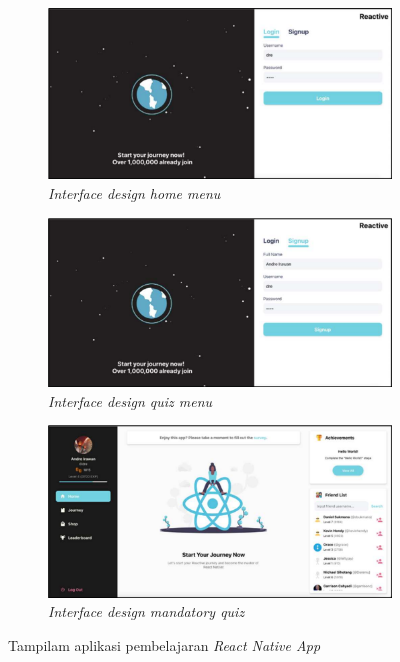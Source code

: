 \begin{figure}[htbp]
	\centering
	\begin{subfigure}[b]{0.4\textwidth}
		\centering
	  \includegraphics[width=\linewidth]{contents/chapter-2/images/Andre-a1.png}
	  \caption{\textit{Interface design home menu}}
	  \label{fig:sub-andre-a1}
	\end{subfigure}
	\begin{subfigure}[b]{0.4\textwidth}
	\centering
	  \includegraphics[width=\linewidth]{contents/chapter-2/images/Andre-a2.png}
	  \caption{\textit{Interface design quiz menu }}
	  \label{fig:sub-andre-a2}
	\end{subfigure}
	\hfill
	\begin{subfigure}[b]{0.4\textwidth}
		\centering
		\includegraphics[width=\linewidth]{contents/chapter-2/images/Andre-a3.png}
		\caption{\textit{Interface design mandatory quiz}}
		\label{fig:sub-andre-a3}
	\end{subfigure}  
	\caption{Tampilam aplikasi pembelajaran \textit{React Native App}}
	\label{fig:interface pembelajaran React Native}
\end{figure}
